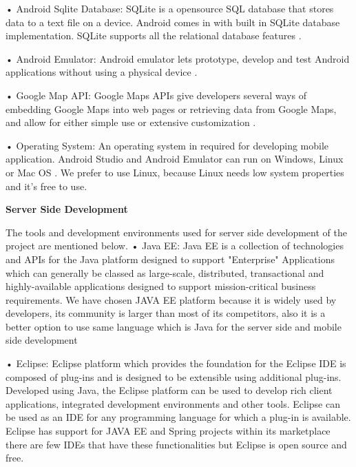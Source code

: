 • Android Sqlite Database: SQLite is a opensource SQL database that stores data to a text file on a device. Android comes in with built in SQLite database implementation. SQLite supports all the relational database features \cite{androidStudioSqlite}.
\newline

• Android Emulator: Android emulator lets prototype, develop and test Android applications without using a physical device \cite{androidEmulator}.
\newline

• Google Map API: Google Maps APIs give developers several ways of embedding Google Maps into web pages or retrieving data from Google Maps, and allow for either simple use or extensive customization \cite{googleMapAPI}.
\newline

• Operating System: An operating system in required for developing mobile application. Android Studio and Android Emulator can run on Windows, Linux or Mac OS \cite{mac}. We prefer to use Linux, because Linux needs low system properties and it's free to use. 

\newline

\textbf{Server Side Development}

The tools and development environments used for server side development of the
project are mentioned below.
\newline
• Java EE: Java EE is a collection of technologies and APIs for the Java platform designed to support "Enterprise" Applications which can generally be classed as large-scale, distributed, transactional and highly-available applications designed to support mission-critical business requirements. \cite{javaEETanim}
We have chosen JAVA EE platform because it is widely used by developers, its community is larger than most of its competitors, also it is a better option to use same language which is Java for the server side and mobile side development


• Eclipse: Eclipse platform which provides the foundation for the Eclipse IDE is composed of plug-ins and is designed to be extensible using additional plug-ins. Developed using Java, the Eclipse platform can be used to develop rich client applications, integrated development environments and other tools. \cite{eclipseTanim}
Eclipse can be used as an IDE for any programming language for which a plug-in is available. Eclipse has support for JAVA EE and Spring projects within its marketplace there are few IDEs that have these functionalities but Eclipse is open source and free.


